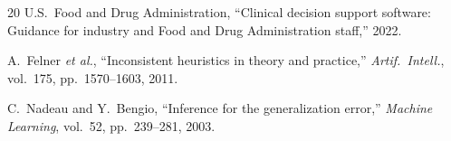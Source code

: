 \documentclass[journal]{IEEEtran}
\begin{document}
\begin{thebibliography}{20}
U.S.\ Food and Drug Administration, ``Clinical decision support
software: Guidance for industry and Food and Drug Administration
staff,'' 2022.

A.~Felner \emph{et al.}, ``Inconsistent heuristics in theory and
practice,'' \emph{Artif.\ Intell.}, vol.~175, pp.~1570--1603, 2011.

C.~Nadeau and Y.~Bengio, ``Inference for the generalization error,''
\emph{Machine Learning}, vol.~52, pp.~239--281, 2003.

\end{thebibliography}
\end{document}
